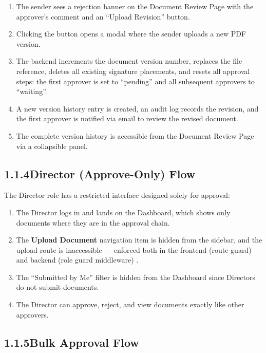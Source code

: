 \documentclass[12pt,a4paper]{report}
\newcommand{\citeref}[1]{%
  \textcolor{citeborder}{%
    \fboxsep=2pt%
    \fcolorbox{citeborder}{citebg}{\footnotesize\bfseries[#1]}%
  }%
}
\begin{document}
\begin{enumerate}
    \item The sender sees a rejection banner on the Document Review Page with the approver's comment and an ``Upload Revision'' button.
    \item Clicking the button opens a modal where the sender uploads a new PDF version.
    \item The backend increments the document version number, replaces the file reference, deletes all existing signature placements, and resets all approval steps: the first approver is set to ``pending'' and all subsequent approvers to ``waiting''.
    \item A new version history entry is created, an audit log records the revision, and the first approver is notified via email to review the revised document.
    \item The complete version history is accessible from the Document Review Page via a collapsible panel.
\end{enumerate}

\subsection*{1.1.4\quad Director (Approve-Only) Flow}

The Director role has a restricted interface designed solely for approval:

\begin{enumerate}
    \item The Director logs in and lands on the Dashboard, which shows only documents where they are in the approval chain.
    \item The \textbf{Upload Document} navigation item is hidden from the sidebar, and the upload route is inaccessible --- enforced both in the frontend (route guard) and backend (role guard middleware) \citeref{4}.
    \item The ``Submitted by Me'' filter is hidden from the Dashboard since Directors do not submit documents.
    \item The Director can approve, reject, and view documents exactly like other approvers.
\end{enumerate}

\subsection*{1.1.5\quad Bulk Approval Flow}
\end{document}
